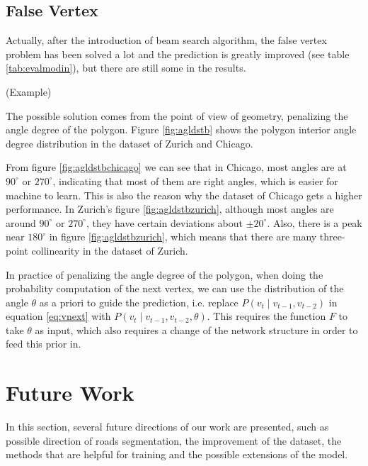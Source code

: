 \subsection{False Vertex}\label{flsvtx}
Actually, after the introduction of beam search algorithm, the false vertex problem has been solved a lot and the prediction is greatly improved (see table \ref{tab:evalmodin}), but there are still some in the results.

(Example)

The possible solution comes from the point of view of geometry, penalizing the angle degree of the polygon. Figure \ref{fig:agldstb} shows the polygon interior angle degree distribution in the dataset of Zurich and Chicago.



From figure \ref{fig:agldstbchicago} we can see that in Chicago, most angles are at $90^\circ$ or $270^\circ$, indicating that most of them are right angles, which is easier for machine to learn. This is also the reason why the dataset of Chicago gets a higher performance. In Zurich's figure \ref{fig:agldstbzurich}, although most angles are around $90^\circ$ or $270^\circ$, they have certain deviations about $\pm20^\circ$. Also, there is a peak near $180^\circ$ in figure \ref{fig:agldstbzurich}, which means that there are many three-point collinearity in the dataset of Zurich.

In practice of penalizing the angle degree of the polygon, when doing the probability computation of the next vertex, we can use the distribution of the angle $\theta$ as a priori to guide the prediction, i.e. replace $P(v_t \mid v_{t-1}, v_{t-2})$ in equation \ref{eq:vnext} with $P(v_t \mid v_{t-1}, v_{t-2}, \theta)$. This requires the function $F$ to take $\theta$ as input, which also requires a change of the network structure in order to feed this prior in.

\section{Future Work}\label{ftrwrk}
In this section, several future directions of our work are presented, such as possible direction of roads segmentation, the improvement of the dataset, the methods that are helpful for training and the possible extensions of the model.

